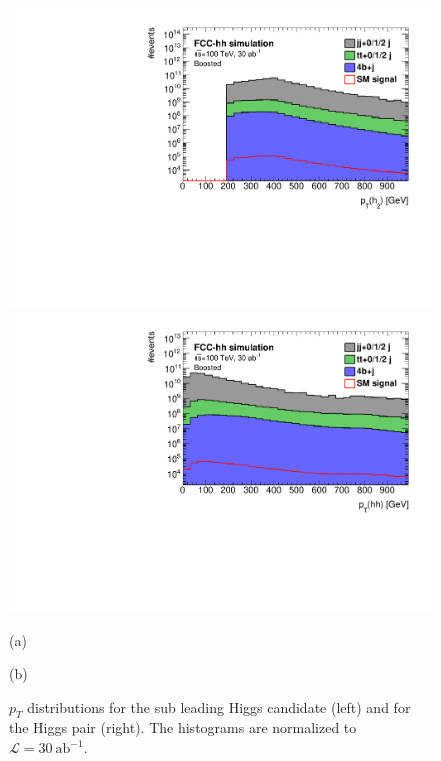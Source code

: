 \begin{figure}
	\centering
	\begin{minipage}{.5\textwidth}
		\centering
		\includegraphics[trim={.65cm 0 0 0},clip,width=\linewidth]{./Figures/hist_h2_pt_stack.pdf}
	\end{minipage}%
	\begin{minipage}{.5\textwidth}
		\centering
		\includegraphics[trim={0 0 .65cm 0},clip,width=\linewidth]{./Figures/hist_hh_pt_stack.pdf}
	\end{minipage}
	\begin{minipage}[t]{0.5\textwidth}
		\caption*{(a)}
	\end{minipage}%
	\hfill
	\begin{minipage}[t]{0.5\textwidth}
		\caption*{(b)}
	\end{minipage}
	\caption{$p_T$ distributions for the sub leading Higgs candidate (left) and for the Higgs pair (right). The histograms are normalized to $\mathcal{L}=30~\text{ab}^{-1}$.}
	\label{fig:pt_stack}
\end{figure} 

